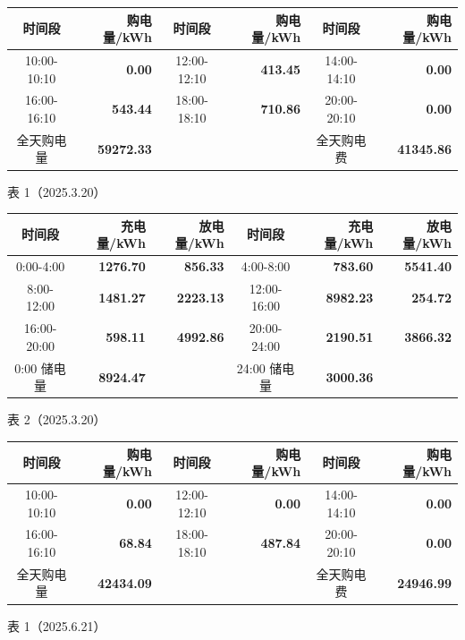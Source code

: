 {\setlength{\tabcolsep}{2pt}
\begin{center}
\noindent
\begin{minipage}[t]{0.485\linewidth}
\begin{tabular}{|c|r|c|r|c|r|}
\hline
时间段 & 购电量/kWh & 时间段 & 购电量/kWh & 时间段 & 购电量/kWh \\
\hline
10:00-10:10 & \textbf{0.00} & 12:00-12:10 & \textbf{413.45} & 14:00-14:10 & \textbf{0.00} \\
\hline
16:00-16:10 & \textbf{543.44} & 18:00-18:10 & \textbf{710.86} & 20:00-20:10 & \textbf{0.00} \\
\hline
全天购电量 & \textbf{59272.33} & & & 全天购电费 & \textbf{41345.86} \\
\hline
\end{tabular}
\par{表 1（2025.3.20）}

\end{minipage}\hfill
\begin{minipage}[t]{0.485\linewidth}
\begin{tabular}{|c|r|r|c|r|r|}
\hline
时间段 & 充电量/kWh & 放电量/kWh & 时间段 & 充电量/kWh & 放电量/kWh \\
\hline
0:00-4:00 & \textbf{1276.70} & \textbf{856.33} & 4:00-8:00 & \textbf{783.60} & \textbf{5541.40} \\
\hline
8:00-12:00 & \textbf{1481.27} & \textbf{2223.13} & 12:00-16:00 & \textbf{8982.23} & \textbf{254.72} \\
\hline
16:00-20:00 & \textbf{598.11} & \textbf{4992.86} & 20:00-24:00 & \textbf{2190.51} & \textbf{3866.32} \\
\hline
0:00 储电量 & \textbf{8924.47} & & 24:00 储电量 & \textbf{3000.36} & \\
\hline
\end{tabular}
\par{表 2（2025.3.20）}

\end{minipage}
\vspace{0.15\baselineskip}
\noindent
\begin{minipage}[t]{0.485\linewidth}
\begin{tabular}{|c|r|c|r|c|r|}
\hline
时间段 & 购电量/kWh & 时间段 & 购电量/kWh & 时间段 & 购电量/kWh \\
\hline
10:00-10:10 & \textbf{0.00} & 12:00-12:10 & \textbf{0.00} & 14:00-14:10 & \textbf{0.00} \\
\hline
16:00-16:10 & \textbf{68.84} & 18:00-18:10 & \textbf{487.84} & 20:00-20:10 & \textbf{0.00} \\
\hline
全天购电量 & \textbf{42434.09} & & & 全天购电费 & \textbf{24946.99} \\
\hline
\end{tabular}
\par{表 1（2025.6.21）}


\end{minipage}
\end{center}}
